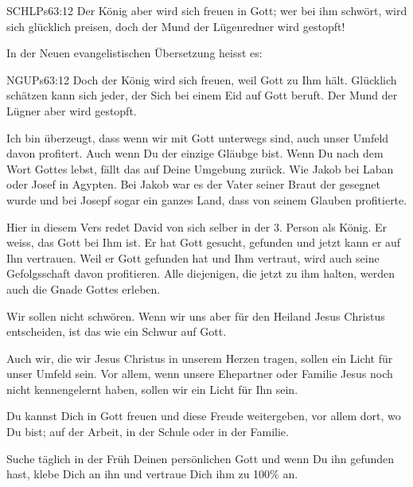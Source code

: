 \documentclass[14pt]{../../inc/mybib}
\begin{document}
\begin{block}
    \begin{bibelbox}{SCHL}{Ps}{63:12}
        Der König aber wird sich freuen in Gott; wer bei ihm schwört, wird sich glücklich preisen, doch der Mund der Lügenredner wird gestopft!
    \end{bibelbox}
    In der Neuen evangelistischen Übersetzung heisst es:
    \begin{bibelbox}{NGU}{Ps}{63:12}
        Doch der König wird sich freuen, weil Gott zu Ihm hält. Glücklich schätzen kann sich jeder, der Sich bei einem Eid auf Gott beruft. Der Mund der Lügner aber wird gestopft.
    \end{bibelbox}
    \begin{block}
        Ich bin überzeugt, dass wenn wir mit Gott unterwegs sind, auch unser Umfeld davon profitert. Auch wenn Du der einzige Gläubge bist. Wenn Du nach dem Wort Gottes lebst, fällt das auf Deine Umgebung zurück. Wie Jakob bei Laban oder Josef in Agypten. Bei Jakob war es der Vater seiner Braut der gesegnet wurde und bei Josepf sogar ein ganzes Land, dass von seinem Glauben profitierte.

        Hier in diesem Vers redet David von sich selber in der 3. Person als König. Er weiss, das Gott bei Ihm ist. Er hat Gott gesucht, gefunden und jetzt kann er auf Ihn vertrauen. Weil er Gott gefunden hat und Ihm vertraut, wird auch seine Gefolgsschaft davon profitieren. Alle diejenigen, die jetzt zu ihm halten, werden auch die Gnade Gottes erleben.

        Wir sollen nicht schwören. Wenn wir uns aber für den Heiland Jesus Christus entscheiden, ist das wie ein Schwur auf Gott.
    \end{block}
    \begin{block}
        Auch wir, die wir Jesus Christus in unserem Herzen tragen, sollen ein Licht für unser Umfeld sein. Vor allem, wenn unsere Ehepartner oder Familie Jesus noch nicht kennengelernt haben, sollen wir ein Licht für Ihn sein.     

        Du kannst Dich in Gott freuen und diese Freude weitergeben, vor allem dort, wo Du bist; auf der Arbeit, in der Schule oder in der Familie.
\end{block}
    Suche täglich in der Früh Deinen persönlichen Gott und wenn Du ihn gefunden hast, klebe Dich an ihn und vertraue Dich ihm zu 100\% an.\\
    \\
    \beten
\end{block}  
\end{document}

